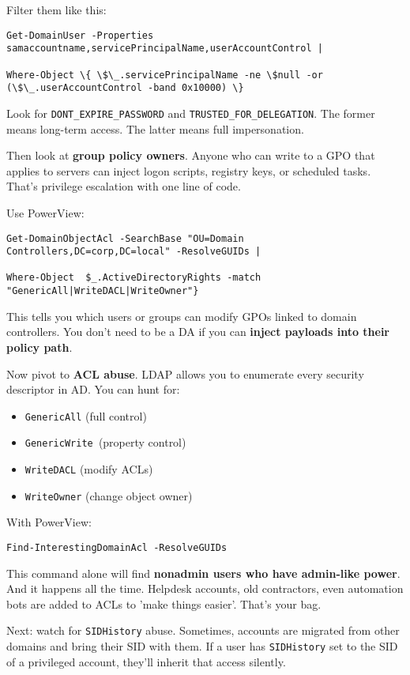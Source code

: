 Filter them like this:
\begin{verbatim}
Get-DomainUser -Properties samaccountname,servicePrincipalName,userAccountControl |

Where-Object \{ \$\_.servicePrincipalName -ne \$null -or (\$\_.userAccountControl -band 0x10000) \}
\end{verbatim}

Look for \texttt{DONT\_EXPIRE\_PASSWORD} and \texttt{TRUSTED\_FOR\_DELEGATION}. The former means long-term access. The latter means full impersonation.

Then look at \textbf{group policy owners}. Anyone who can write to a GPO that applies to servers can inject logon scripts, registry keys, or scheduled tasks. That’s privilege escalation with one line of code.

Use PowerView:
\begin{verbatim}
Get-DomainObjectAcl -SearchBase "OU=Domain Controllers,DC=corp,DC=local" -ResolveGUIDs |

Where-Object  $_.ActiveDirectoryRights -match "GenericAll|WriteDACL|WriteOwner"}
\end{verbatim}
This tells you which users or groups can modify GPOs linked to domain controllers. You don’t need to be a DA if you can \textbf{inject payloads into their policy path}.

Now pivot to \textbf{ACL abuse}. LDAP allows you to enumerate every security descriptor in AD. You can hunt for:

\begin{itemize}
    \item \texttt{GenericAll} (full control)
    \item \texttt{GenericWrite }(property control)
    \item \texttt{WriteDACL} (modify ACLs)
    \item \texttt{WriteOwner} (change object owner)


\end{itemize}

With PowerView:
\begin{verbatim}
Find-InterestingDomainAcl -ResolveGUIDs
\end{verbatim}
This command alone will find \textbf{ nonadmin users who have admin-like power}. And it happens all the time. Helpdesk accounts, old contractors, even automation bots are added to ACLs to 'make things easier'. That's your bag.

Next: watch for \texttt{SIDHistory} abuse. Sometimes, accounts are migrated from other domains and bring their SID with them. If a user has \texttt{SIDHistory} set to the SID of a privileged account, they’ll inherit that access silently.

